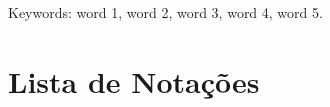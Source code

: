 \documentclass[12pt,oneside]{book} %
\begin{document}
    \noindent Keywords: word 1, word 2, word 3, word 4, word 5.










    \tableofcontents %
    \thispagestyle{empty}

    \listoffigures %
    \thispagestyle{empty}

    \listoftables %
    \thispagestyle{empty}










    \chapter*{Lista de Notações}
    \thispagestyle{empty}





\end{document}
